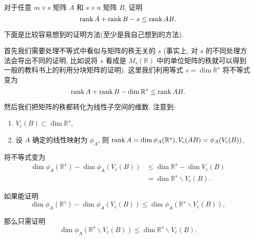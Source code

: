 \documentclass{ctexart}
\begin{document}
\begin{exercise}\label{ex3.8}
    对于任意 $m\times s$ 矩阵 $A$ 和 $s\times n$ 矩阵 $B$, 证明
    \[\operatorname{rank} A+\operatorname{rank} B-s\leq\operatorname{rank}  AB.\]
\end{exercise}
下面是比较容易想到的证明方法(至少是我自己想到的方法).
\begin{thought}
    首先我们需要处理不等式中看似与矩阵的秩无关的 $s$ (事实上, 对 $s$ 的不同处理方法会导出不同的证明, 比如说将 $s$ 看成是 $M_s(\mathbb{R})$ 中的单位矩阵的秩就可以得到一般的教科书上的利用分块矩阵的证明). 这里我们利用等式 $s=\dim\mathbb{R}^s$ 将不等式变为
    \[\operatorname{rank} A+\operatorname{rank} B-\dim\mathbb{R}^s\leq\operatorname{rank}  AB.\]

    然后我们把矩阵的秩都转化为线性子空间的维数. 注意到:
    \begin{enumerate}
        \item $V_c(B)\subset\dim\mathbb{R}^s$,
        \item 设 $A$ 确定的线性映射为 $\phi_A$, 则 $\operatorname{rank} A=\dim\phi_A(\mathbb{R}^s),V_c(AB)=\phi_A(V_c(B))$,
    \end{enumerate}

    将不等式变为
    \begin{align*}
        \dim\phi_A(\mathbb{R}^s)-\dim\phi_A(V_c(B)) & \leq\dim\mathbb{R}^s-\dim V_c(B) \\
        & =\dim\mathbb{R}^s\backslash V_c(B).
    \end{align*}

    如果能证明
    \[\dim\phi_A(\mathbb{R}^s)-\dim\phi_A(V_c(B))\leq\dim\phi_A(\mathbb{R}^s\backslash V_c(B)),\]

    那么只需证明
    \[\dim\phi_A(\mathbb{R}^s\backslash V_c(B))\leq\dim\mathbb{R}^s\backslash V_c(B).\]
\end{thought}
\end{document}
